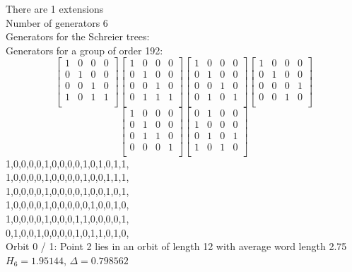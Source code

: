 There are 1 extensions\\
Number of generators 6\\
Generators for the Schreier trees:\\
{\small\arraycolsep=2pt
Generators for a group of order 192:
$$
\left[
\begin{array}{*{4}{r}}
1 & 0 & 0 & 0\\
0 & 1 & 0 & 0\\
0 & 0 & 1 & 0\\
1 & 0 & 1 & 1\\
\end{array}
\right]
\left[
\begin{array}{*{4}{r}}
1 & 0 & 0 & 0\\
0 & 1 & 0 & 0\\
0 & 0 & 1 & 0\\
0 & 1 & 1 & 1\\
\end{array}
\right]
\left[
\begin{array}{*{4}{r}}
1 & 0 & 0 & 0\\
0 & 1 & 0 & 0\\
0 & 0 & 1 & 0\\
0 & 1 & 0 & 1\\
\end{array}
\right]
\left[
\begin{array}{*{4}{r}}
1 & 0 & 0 & 0\\
0 & 1 & 0 & 0\\
0 & 0 & 0 & 1\\
0 & 0 & 1 & 0\\
\end{array}
\right]
$$
$$
\left[
\begin{array}{*{4}{r}}
1 & 0 & 0 & 0\\
0 & 1 & 0 & 0\\
0 & 1 & 1 & 0\\
0 & 0 & 0 & 1\\
\end{array}
\right]
\left[
\begin{array}{*{4}{r}}
0 & 1 & 0 & 0\\
1 & 0 & 0 & 0\\
0 & 1 & 0 & 1\\
1 & 0 & 1 & 0\\
\end{array}
\right]
$$
1,0,0,0,0,1,0,0,0,0,1,0,1,0,1,1,\\
1,0,0,0,0,1,0,0,0,0,1,0,0,1,1,1,\\
1,0,0,0,0,1,0,0,0,0,1,0,0,1,0,1,\\
1,0,0,0,0,1,0,0,0,0,0,1,0,0,1,0,\\
1,0,0,0,0,1,0,0,0,1,1,0,0,0,0,1,\\
0,1,0,0,1,0,0,0,0,1,0,1,1,0,1,0,\\
}
\noindent Orbit 0 / 1: Point 2 lies in an orbit of length 12 with average word length 2.75 $H_{6} = 1.95144$, $\Delta = 0.798562$\\
